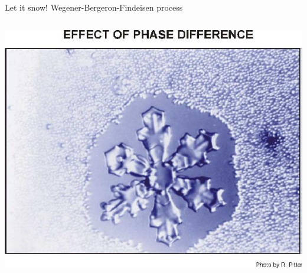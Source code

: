 \documentclass[xcolor=table]{beamer}
\begin{document}
\begin{frame}{Let it snow!}
	\hfill Wegener-\alert{Bergeron}-Findeisen \alert{process}
	\begin{columns}[b]
	\includegraphics[width=\textwidth,clip=true,trim=0 0 0 1cm]{presentation/Pitter1.jpg}
	

\end{columns}
\end{frame}
\end{document}
